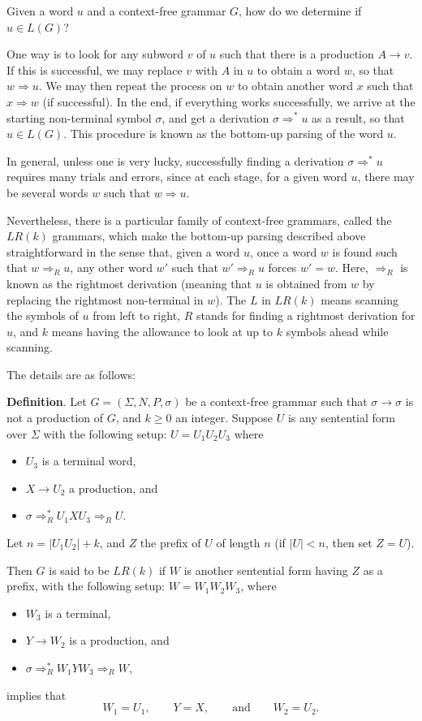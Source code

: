 \documentclass[12pt]{article}
\begin{document}
Given a word $u$ and a context-free grammar $G$, how do we determine if $u\in L(G)$?  

One way is to look for any subword $v$ of $u$ such that there is a production $A\to v$.  If this is successful, we may replace $v$ with $A$ in $u$ to obtain a word $w$, so that $w \Rightarrow u$.  We may then repeat the process on $w$ to obtain another word $x$ such that $x\Rightarrow w$ (if successful).  In the end, if everything works successfully, we arrive at the starting non-terminal symbol $\sigma$, and get a derivation $\sigma\Rightarrow^* u$ as a result, so that $u\in L(G)$.  This procedure is known as the bottom-up parsing of the word $u$.

In general, unless one is very lucky, successfully finding a derivation $\sigma\Rightarrow^* u$ requires many trials and errors, since at each stage, for a given word $u$, there may be several words $w$ such that $w\Rightarrow u$.

Nevertheless, there is a particular family of context-free grammars, called the $LR(k)$ grammars, which make the bottom-up parsing described above straightforward in the sense that, given a word $u$, once a word $w$ is found such that $w\Rightarrow_R u$, any other word $w'$ such that $w'\Rightarrow_R u$ forces $w'=w$.  Here, $\Rightarrow_R$ is known as the rightmost derivation (meaning that $u$ is obtained from $w$ by replacing the rightmost non-terminal in $w$).  The $L$ in $LR(k)$ means scanning the symbols of $u$ from left to right, $R$ stands for finding a rightmost derivation for $u$, and $k$ means having the allowance to look at up to $k$ symbols ahead while scanning.

The details are as follows:

\textbf{Definition}.  Let $G=(\Sigma,N,P,\sigma)$ be a context-free grammar such that $\sigma\to \sigma$ is not a production of $G$, and $k\ge 0$ an integer.  Suppose $U$ is any sentential form over $\Sigma$ with the following setup: $U=U_1U_2U_3$ where
\begin{itemize}
\item $U_3$ is a terminal word, 
\item $X\to U_2$ a production, and 
\item $\sigma \Rightarrow_R^* U_1XU_3 \Rightarrow_R U$.
\end{itemize}
Let $n=|U_1U_2|+k$, and $Z$ the prefix of $U$ of length $n$ (if $|U|<n$, then set $Z=U$).

Then $G$ is said to be $LR(k)$ if $W$ is another sentential form having $Z$ as a prefix, with the following setup: $W=W_1W_2W_3$, where
\begin{itemize}
\item $W_3$ is a terminal, 
\item $Y\to W_2$ is a production, and 
\item $\sigma \Rightarrow_R^* W_1YW_3 \Rightarrow_R W$,
\end{itemize}
implies that $$W_1=U_1,\qquad Y=X, \qquad \mbox{and} \qquad W_2=U_2.$$
\end{document}
